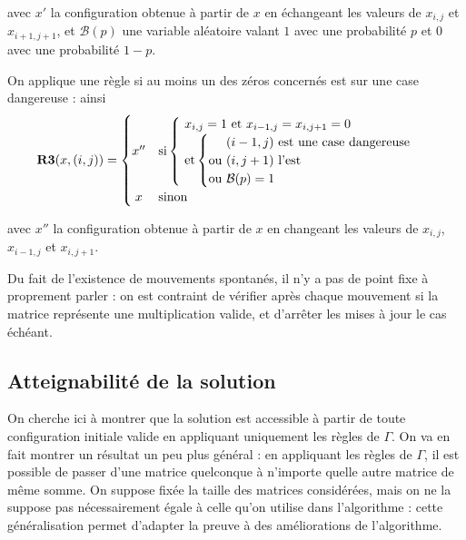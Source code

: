\documentclass[11pt, openany]{article}
\begin{document}
avec $x'$ la configuration obtenue à partir de $x$ en échangeant les valeurs de $x_{i,j}$ et $x_{i+1,j+1}$, et $\mathcal{B}(p)$ une variable aléatoire valant $1$ avec une probabilité $p$ et $0$ avec une probabilité $1-p$.

On applique une règle si au moins un des zéros concernés est sur une case dangereuse : ainsi \[
\textbf{R3}(x,(i,j))=
\begin{cases}
  \hfill x'' \hfill & \text {si} \begin{cases}\text{ $x_{i,j}=1$ et $x_{i-1,j}=x_{i,j+1}=0$} \\
    \text{ et} \left\{
        \begin{tabular}{@{}c@{}l}
          &\text{ $(i-1,j)$ est une case dangereuse}\\
          \text {ou}& \text{ $(i,j+1)$ l'est}\\
          \text {ou}& \text{ $\mathcal{B}(p)=1$}\\
        \end{tabular}
      \right.
    \end{cases}
  \\
  \hfill x \hfill & \text {sinon}
\end{cases}
\]

avec $x''$ la configuration obtenue à partir de $x$ en changeant les valeurs de $x_{i,j}$, $x_{i-1,j}$ et $x_{i,j+1}$.

\medskip

Du fait de l'existence de mouvements spontanés, il n'y a pas de point fixe à proprement parler : on est contraint de vérifier après chaque mouvement si la matrice représente une multiplication valide, et d'arrêter les mises à jour le cas échéant. 

\subsection*{Atteignabilité de la solution}

On cherche ici à montrer que la solution est accessible à partir de toute configuration initiale valide en appliquant uniquement les règles de $\Gamma$. On va en fait montrer un résultat un peu plus général : en appliquant les règles de $\Gamma$, il est possible de passer d'une matrice quelconque à n'importe quelle autre matrice de même somme. On suppose fixée la taille des matrices considérées, mais on ne la suppose pas nécessairement égale à celle qu'on utilise dans l'algorithme : cette généralisation permet d'adapter la preuve à des améliorations de l'algorithme.
\end{document}
